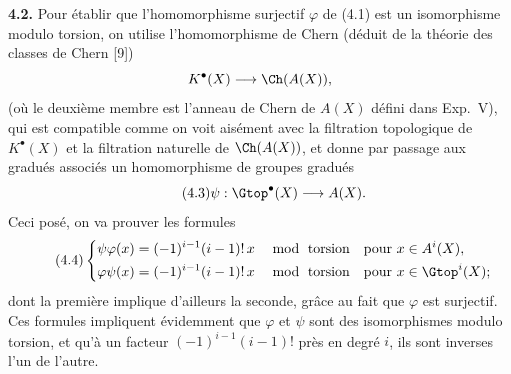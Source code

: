 \textbf{4.2.} Pour établir que l'homomorphisme surjectif $\varphi$ de (4.1) est un isomorphisme modulo torsion, on utilise l'homomorphisme de Chern (déduit de la théorie des classes de Chern [9])
\[
 K^\bullet(X)\longrightarrow \Ch(A(X)),
\]
(où le deuxième membre est l'anneau de Chern de $A(X)$ défini dans Exp.~V), qui est compatible comme on voit aisément avec la filtration topologique de $K^\bullet(X)$ et la filtration naturelle de $\Ch(A(X))$, et donne par passage aux gradués associés un homomorphisme de groupes gradués
\begin{equation}\tag{4.3}
 \psi:\Gtop^\bullet(X)\longrightarrow A(X).
\end{equation}
Ceci posé, on va prouver les formules
\begin{equation}\tag{4.4}
\left\{
\begin{aligned}
 \psi\varphi(x)&=(-1)^{i-1}(i-1)!\,x\quad \bmod \text{ torsion}\quad \text{pour } x\in A^i(X),\\
 \varphi\psi(x)&=(-1)^{i-1}(i-1)!\,x\quad \bmod \text{ torsion}\quad \text{pour } x\in \Gtop^i(X);
\end{aligned}
\right.
\end{equation}
dont la première implique d'ailleurs la seconde, grâce au fait que $\varphi$ est surjectif. Ces formules impliquent évidemment que $\varphi$ et $\psi$ sont des isomorphismes modulo torsion, et qu'à un facteur $(-1)^{i-1}(i-1)!$ près en degré $i$, ils sont inverses l'un de l'autre.

